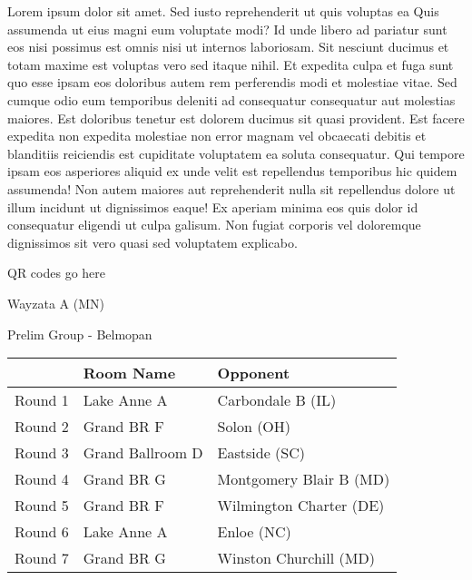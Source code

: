 \documentclass{article}%
\begin{document}
\vspace*{8pt}%
\linebreak%
\newline%
\newline%
Lorem ipsum dolor sit amet. Sed iusto reprehenderit ut quis voluptas ea Quis assumenda ut eius magni eum voluptate modi? Id unde libero ad pariatur sunt eos nisi possimus est omnis nisi ut internos laboriosam. Sit nesciunt ducimus et totam maxime est voluptas vero sed itaque nihil. Et expedita culpa et fuga sunt quo esse ipsam eos doloribus autem rem perferendis modi et molestiae vitae.\newline%
\newline%
Sed cumque odio eum temporibus deleniti ad consequatur consequatur aut molestias maiores. Est doloribus tenetur est dolorem ducimus sit quasi provident. Est facere expedita non expedita molestiae non error magnam vel obcaecati debitis et blanditiis reiciendis est cupiditate voluptatem ea soluta consequatur. Qui tempore ipsam eos asperiores aliquid ex unde velit est repellendus temporibus hic quidem assumenda!\newline%
\newline%
Non autem maiores aut reprehenderit nulla sit repellendus dolore ut illum incidunt ut dignissimos eaque! Ex aperiam minima eos quis dolor id consequatur eligendi ut culpa galisum. Non fugiat corporis vel doloremque dignissimos sit vero quasi sed voluptatem explicabo.\newline%
\newline%
%
\vspace*{30pt}%
\begin{center}%
\begin{Huge}%
QR codes go here%
\end{Huge}%
\end{center}%
\newpage%
%
\begin{center}%
\begin{Huge}%
Wayzata A (MN)%
\end{Huge}%
\vspace*{8pt}%
\linebreak%
\begin{Large}%
Prelim Group {-} Belmopan%
\end{Large}%
\end{center}%
\begin{tabularx}{\textwidth}{|c|Y|Y|}%
\hline%
&Room Name&Opponent\\%
\hline%
Round 1&Lake Anne A&Carbondale B (IL)\\%
Round 2&Grand BR F&Solon (OH)\\%
Round 3&Grand Ballroom D&Eastside (SC)\\%
Round 4&Grand BR G&Montgomery Blair B (MD)\\%
Round 5&Grand BR F&Wilmington Charter (DE)\\%
Round 6&Lake Anne A&Enloe (NC)\\%
Round 7&Grand BR G&Winston Churchill (MD)\\%
\hline%
\end{tabularx}%
\end{document}
